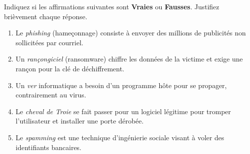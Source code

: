 \documentclass[11pt]{article}
\begin{document}
\begin{exercice}
Indiquez si les affirmations suivantes sont \textbf{Vraies} ou \textbf{Fausses}. Justifiez brièvement chaque réponse.
\begin{enumerate}
    \item Le \textit{phishing} (hameçonnage) consiste à envoyer des millions de publicités non sollicitées par courriel.
    \item Un \textit{rançongiciel} (ransomware) chiffre les données de la victime et exige une rançon pour la clé de déchiffrement.
    \item Un \textit{ver} informatique a besoin d'un programme hôte pour se propager, contrairement au virus.
    \item Le \textit{cheval de Troie} se fait passer pour un logiciel légitime pour tromper l'utilisateur et installer une porte dérobée.
    \item Le \textit{spamming} est une technique d'ingénierie sociale visant à voler des identifiants bancaires.
\end{enumerate}
\end{exercice}
\end{document}
